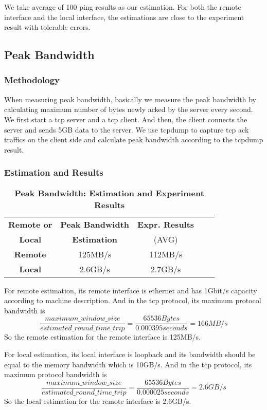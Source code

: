 We take average of 100 ping results as our estimation. For both the remote interface and the local interface, the estimations are close to the experiment result with tolerable errors.

\subsection{Peak Bandwidth}

\subsubsection{Methodology}
When measuring peak bandwidth, basically we measure the peak bandwidth by calculating maximum number of bytes newly acked by the server every second. We first start a tcp server and a tcp client. And then, the client connects the server and sends 5GB data to the server. We use tcpdump to capture tcp ack traffics on the client side and calculate peak bandwidth according to the tcpdump result.

\subsubsection{Estimation and Results}
\begin{table}[ht]
  \centering
  \caption{\textbf{Peak Bandwidth: Estimation and Experiment Results}}
  \begin{threeparttable}
  \begin{tabular}{ccccc}
  \hline
      \textbf{Remote or} & \textbf{Peak Bandwidth}   & \textbf{Expr. Results} \\
      \textbf{Local}   &  \textbf{Estimation}  & (AVG) \\
  \hline
      \textbf{Remote}  & 125MB/s & 112MB/s \\
      \textbf{Local} & 2.6GB/s & 2.7GB/s \\
  \hline
  \end{tabular}
  \end{threeparttable}
  \label{peak_bandwidth_table}
\end{table}

For remote estimation, its remote interface is ethernet and has 1Gbit/s capacity according to machine description. And in the tcp protocol, its maximum protocol bandwidth is $$\frac{maximum\_window\_size}{estimated\_round\_time\_trip} = \frac{65536 Bytes}{0.000395 seconds} = 166MB/s$$So the remote estimation for the remote interface is 125MB/s.

For local estimation, its local interface is loopback and its bandwidth should be equal to the memory bandwidth which is 10GB/s. And in the tcp protocol, its maximum protocol bandwidth is $$\frac{maximum\_window\_size}{estimated\_round\_time\_trip} = \frac{65536 Bytes}{0.000025 seconds} = 2.6GB/s$$So the local estimation for the remote interface is 2.6GB/s.

